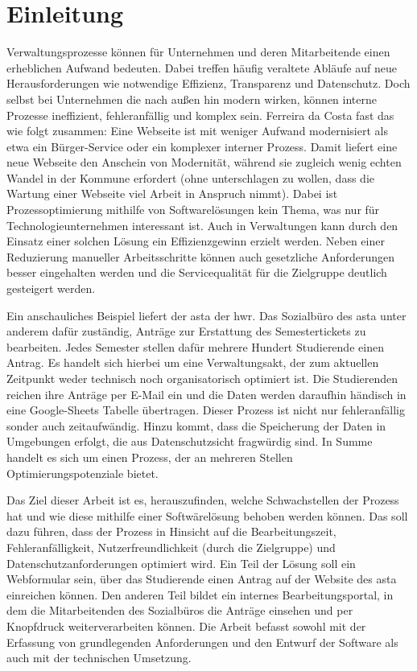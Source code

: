
\chapter{Einleitung}\label{cha:Einleitung}

Verwaltungsprozesse können für Unternehmen und deren Mitarbeitende einen erheblichen Aufwand bedeuten. Dabei treffen häufig veraltete Abläufe auf neue Herausforderungen wie notwendige Effizienz, Transparenz und Datenschutz. Doch selbst bei Unternehmen die nach außen hin modern wirken, können interne Prozesse ineffizient, fehleranfällig und komplex sein. Ferreira da Costa fast das wie folgt zusammen: \glqq{}Eine Webseite ist mit weniger Aufwand modernisiert als etwa ein Bürger-Service oder ein komplexer interner Prozess. Damit liefert eine neue Webseite den Anschein von Modernität, während sie zugleich wenig echten Wandel in der Kommune erfordert (ohne unterschlagen zu wollen, dass die Wartung einer Webseite viel Arbeit in Anspruch nimmt).\grqq{}  Dabei ist Prozessoptimierung mithilfe von Softwarelösungen kein Thema, was nur für Technologieunternehmen interessant ist. Auch in Verwaltungen kann durch den Einsatz einer solchen Lösung ein Effizienzgewinn erzielt werden. Neben einer Reduzierung manueller Arbeitsschritte können auch gesetzliche Anforderungen besser eingehalten werden und die Servicequalität für die Zielgruppe deutlich gesteigert werden.  

Ein anschauliches Beispiel liefert der \gls{asta} der \gls{hwr}. Das Sozialbüro des \gls{asta} unter anderem dafür zuständig, Anträge zur Erstattung des Semestertickets zu bearbeiten. Jedes Semester stellen dafür mehrere Hundert Studierende einen Antrag. Es handelt sich hierbei um eine Verwaltungsakt, der zum aktuellen Zeitpunkt weder technisch noch organisatorisch optimiert ist. Die Studierenden reichen ihre Anträge per E-Mail ein und die Daten werden daraufhin händisch in eine Google-Sheets Tabelle übertragen. Dieser Prozess ist nicht nur fehleranfällig sonder auch zeitaufwändig. Hinzu kommt, dass die Speicherung der Daten in Umgebungen erfolgt, die aus Datenschutzsicht fragwürdig sind. In Summe handelt es sich um einen Prozess, der an mehreren Stellen Optimierungspotenziale bietet. 

Das Ziel dieser Arbeit ist es, herauszufinden, welche Schwachstellen der Prozess hat und wie diese mithilfe einer Softwärelösung behoben werden können. Das soll dazu führen, dass der Prozess in Hinsicht auf die Bearbeitungszeit, Fehleranfälligkeit, Nutzerfreundlichkeit (durch die Zielgruppe) und Datenschutzanforderungen optimiert wird. 
Ein Teil der Lösung soll ein Webformular sein, über das Studierende einen Antrag auf der Website des \gls{asta} einreichen können. Den anderen Teil bildet ein internes Bearbeitungsportal, in dem die Mitarbeitenden des Sozialbüros die Anträge einsehen und per Knopfdruck weiterverarbeiten können. Die Arbeit befasst sowohl mit der Erfassung von grundlegenden Anforderungen und den Entwurf der Software als auch mit der technischen Umsetzung. 

